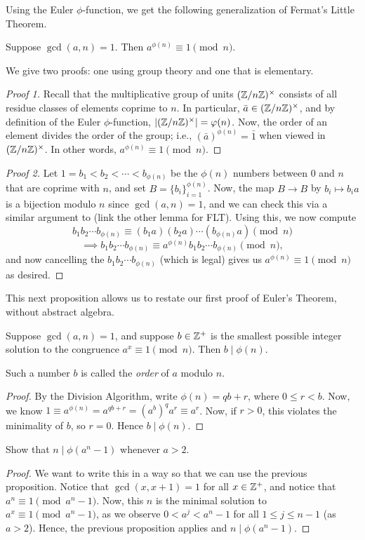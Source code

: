 \documentclass{article}
\begin{document}
Using the Euler $\phi$-function, we get the following generalization of Fermat's Little Theorem.
\begin{theorem}
Suppose $\gcd(a,n) = 1$. Then $a^{\phi(n)} \equiv 1\pmod n$.
\end{theorem}
We give two proofs: one using group theory and one that is elementary.
\begin{proof}[Proof 1]
Recall that the multiplicative group of units $(\mathbb Z/n\mathbb Z)^\times$ consists of all residue classes of elements coprime to $n$. In particular, $\bar a\in (\mathbb Z/n\mathbb Z)^\times$, and by definition of the Euler $\phi$-function, $\left|(\mathbb Z/n\mathbb Z)^\times\right| = \varphi(n)$. Now, the order of an element divides the order of the group; i.e., $(\bar a)^{\phi(n)} = \bar 1$ when viewed in $(\mathbb Z/n\mathbb Z)^\times$. In other words, $a^{\phi(n)}\equiv 1\pmod n$.
\end{proof}
\begin{proof}[Proof 2]
Let $1 =b_1 < b_2 < \cdots < b_{\phi(n)}$ be the $\phi(n)$ numbers between $0$ and $n$ that are coprime with $n$, and set $B = \{b_i\}_{i=1}^{\phi(n)}$. Now, the map $B\to B$ by $b_i \mapsto b_ia$ is a bijection modulo $n$ since $\gcd(a,n) = 1$, and we can check this via a similar argument to (link the other lemma for FLT). Using this, we now compute
$$b_1b_2\cdots b_{\phi(n)} \equiv (b_1a)(b_2a)\cdots (b_{\phi(n)}a) \pmod{n}$$
$$\implies b_1b_2\cdots b_{\phi(n)} \equiv a^{\phi(n)} b_1b_2\cdots b_{\phi(n)} \pmod n,$$
and now cancelling the $b_1b_2\cdots b_{\phi(n)}$ (which is legal) gives us $a^{\phi(n)} \equiv 1\pmod n$ as desired.
\end{proof}

This next proposition allows us to restate our first proof of Euler's Theorem, without abstract algebra.
\begin{proposition}
Suppose $\gcd(a,n) = 1$, and suppose $b\in\mathbb Z^+$ is the smallest possible integer solution to the congruence $a^x\equiv 1\pmod n$. Then $b\mid \phi(n)$.
\end{proposition}
Such a number $b$ is called the \textit{order} of $a$ modulo $n$.
\begin{proof}
By the Division Algorithm, write $\phi(n) = qb + r$, where $0\leq r < b$. Now, we know $1\equiv a^{\phi(n)} = a^{qb+r} = (a^b)^qa^r \equiv a^r$. Now, if $r > 0$, this violates the minimality of $b$, so $r=0$. Hence $b \mid \phi(n)$.
\end{proof}

\begin{example}
Show that $n\mid \phi(a^n - 1)$ whenever $a>2$.
\end{example}
\begin{proof}
We want to write this in a way so that we can use the previous proposition. Notice that $\gcd(x, x+1) = 1$ for all $x\in\mathbb Z^+$, and notice that $a^n\equiv 1\pmod{a^n-1}$. Now, this $n$ is the minimal solution to $a^x \equiv 1\pmod{a^n-1}$, as we observe $0 < a^j < a^n-1$ for all $1\leq j \leq n-1$ (as $a>2$). Hence, the previous proposition applies and $n\mid \phi(a^n - 1)$.
\end{proof}
\end{document}
